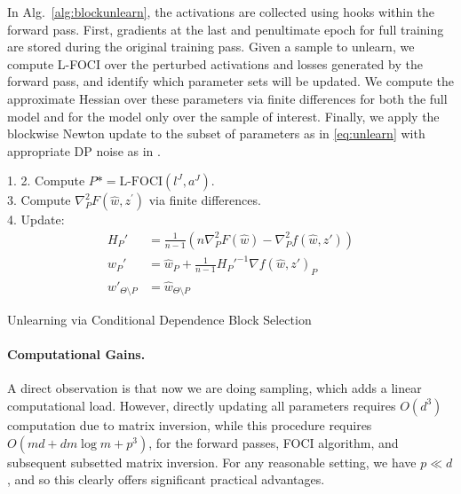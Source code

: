 In Alg.~\ref{alg:blockunlearn}, the activations are collected using hooks within the forward pass. 
First, gradients at the last and penultimate epoch for full training are stored during the original training pass. Given a sample to unlearn, we compute L-FOCI over the perturbed activations and losses generated by the forward pass, and identify which parameter sets will be updated. We compute the approximate Hessian over these parameters via finite differences for both the full model and for the model only over the sample of interest. Finally, we apply the blockwise Newton update to the subset of parameters as in \eqref{eq:unlearn} with appropriate DP noise as in \cite{sekhari2021remember}.
\begin{algorithm}
\small
\SetAlgoLined
{}
1. 
2. Compute $P* = \mbox{L-FOCI}(l^J, a^J)$. \\
3. Compute $\nabla^2_{P} F(\hat{w}, z^\prime)$ via finite differences. \\
4. Update:
\begin{align}
    H_P' &= \frac{1}{n-1}\left(n \nabla^2_{P} F(\hat{w}) - \nabla^2_{P} f(\hat{w}, z')\right) \\
    w_{P}' &= \hat{w}_{P} + \frac{1}{n-1}H_{P}'^{-1} \nabla f(\hat{w}, z')_{P} \\
    w'_{\Theta\setminus P} &= \hat{w}_{\Theta\setminus P}
\end{align}
 \caption{\label{alg:blockunlearn} Unlearning via Conditional Dependence Block Selection}
\end{algorithm}

\paragraph{Computational Gains.}
A direct observation is that now we are doing sampling, which adds a linear computational load.
However, directly updating all parameters requires $O(d^3)$ computation due to matrix inversion, while this procedure requires $O(md + dm\log m + p^3)$, for the forward passes, FOCI algorithm, and subsequent subsetted matrix inversion. For any reasonable setting, we have $p \ll d$, and so this clearly offers significant practical advantages.








